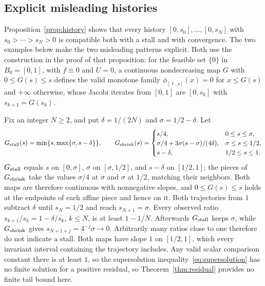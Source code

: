 \subsection{Explicit misleading histories}\label{sec:histories-con}

Proposition~\ref{prop:history} shows that every history
$[0,s_0],\ldots,[0,s_N]$ with $s_0>\cdots>s_N>0$ is compatible both
with a stall and with convergence.
The two examples below make the two misleading patterns explicit. Both
use the construction in the proof of that proposition: for the feasible
set $\{0\}$ in $B_0=[0,1]$, with $f\equiv0$ and $U=0$, a continuous
nondecreasing map $G$ with $0\le G(s)\le s$ defines the valid monotone
family $\phi_{[\ell,s]}(x)=0$ for $x\le G(s)$ and $+\infty$ otherwise, whose
Jacobi iterates from $[0,1]$ are $[0,s_k]$ with $s_{k+1}=G(s_k)$.

\begin{example}\label{ex:long-history-con}
Fix an integer $N\ge2$, and put $\delta=1/(2N)$ and $\sigma=1/2-\delta$.
Let
\[
 G_{\rm stall}(s)=\min\{s,\max\{\sigma,s-\delta\}\},\qquad
 G_{\rm shrink}(s)=\begin{cases}
  s/4,&0\le s\le\sigma,\\
  \sigma/4+3\sigma(s-\sigma)/(4\delta),&\sigma\le s\le1/2,\\
  s-\delta,&1/2\le s\le1.
 \end{cases}
\]
$G_{\rm stall}$ equals $s$ on $[0,\sigma]$, $\sigma$ on $[\sigma,1/2]$, and
$s-\delta$ on $[1/2,1]$; the pieces of $G_{\rm shrink}$ take the values
$\sigma/4$ at $\sigma$ and $\sigma$ at $1/2$, matching their neighbors.
Both maps are therefore continuous with nonnegative slopes, and
$0\le G(s)\le s$ holds at the endpoints of each affine piece and hence on
it. Both trajectories from $1$ subtract $\delta$ until $s_N=1/2$ and reach
$s_{N+1}=\sigma$. Every observed ratio $s_{k+1}/s_k=1-\delta/s_k$, $k\le N$,
is at least $1-1/N$. Afterwards $G_{\rm stall}$ keeps $\sigma$, while
$G_{\rm shrink}$ gives $s_{N+1+j}=4^{-j}\sigma\to0$. Arbitrarily many
ratios close to one therefore do not indicate a stall. Both maps have slope
$1$ on $[1/2,1]$, which every invariant interval containing the trajectory
includes. Any valid scalar comparison constant there is at least $1$, so
the supersolution inequality~\eqref{eq:supersolution} has no finite
solution for a positive residual, so Theorem~\ref{thm:residual} provides
no finite tail bound here.
\end{example}

